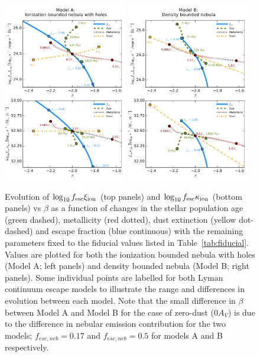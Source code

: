 \begin{figure}
\centering
  \includegraphics[width=0.48\textwidth]{plots/Fig7a.pdf}\quad
  \includegraphics[width=0.48\textwidth]{plots/Fig7b.pdf}
  \caption[Evolution of $\log_{10}f_{\rm{esc}}\xi_{\rm{ion}}$ (top panels) and $\log_{10}f_{\rm{esc}}\kappa_{\rm{ion}}$ (bottom panels) vs $\beta$ as a function of different stellar population parameters.]{Evolution of $\log_{10}f_{\rm{esc}}\xi_{\rm{ion}}$ (top panels) and $\log_{10}f_{\rm{esc}}\kappa_{\rm{ion}}$ (bottom panels) vs $\beta$ as a function of changes in the stellar population age (green dashed), metallicity (red dotted), dust extinction (yellow dot-dashed) and escape fraction (blue continuous) with the remaining parameters fixed to the fiducial values listed in Table~\ref{tab:fiducial}. Values are plotted for both the ionization bounded nebula with holes (Model A; left panels) and density bounded nebula (Model B; right panels). Some individual points are labelled for both Lyman continuum escape models to illustrate the range and differences in evolution between each model. Note that the small difference in $\beta$ between Model A and Model B for the case of zero-dust ($0 A_{V}$) is due to the difference in nebular emission contribution for the two models; $f_{esc,neb} = 0.17$ and $f_{esc,neb} = 0.5$ for models A and B respectively.}
  \label{fig:xi_evol}
\end{figure}

